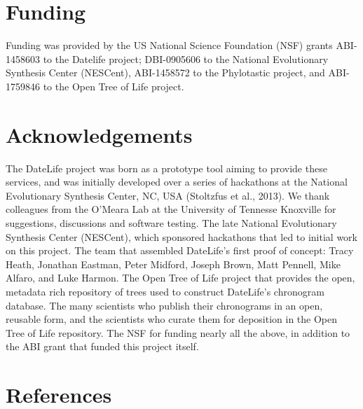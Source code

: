\documentclass[
  man]{apa6}
\begin{document}
\hypertarget{funding}{%
\section{Funding}\label{funding}}

Funding was provided by the US National Science Foundation (NSF) grants ABI-1458603 to the Datelife project; DBI-0905606 to the National Evolutionary Synthesis Center (NESCent), ABI-1458572 to the Phylotastic project, and ABI-1759846 to the Open Tree of Life project.

\hypertarget{acknowledgements}{%
\section{Acknowledgements}\label{acknowledgements}}

The DateLife project was born as a prototype tool aiming to provide these services, and was initially developed over a series of hackathons at the National Evolutionary Synthesis Center, NC, USA (Stoltzfus et al., 2013).
We thank colleagues from the O'Meara Lab at the University
of Tennesse Knoxville for suggestions, discussions and software testing.
The late National Evolutionary Synthesis Center (NESCent), which sponsored hackathons
that led to initial work on this project. The team that assembled DateLife's first proof of concept: Tracy Heath, Jonathan Eastman, Peter Midford, Joseph Brown, Matt Pennell, Mike Alfaro, and Luke Harmon.
The Open Tree of Life project that provides the open, metadata rich repository of
trees used to construct DateLife's chronogram database.
The many scientists who publish their chronograms in an open, reusable form, and the scientists who curate them for deposition in the Open Tree of Life repository.
The NSF for funding nearly all the above, in addition to the ABI grant that funded this project itself.

\newpage

\hypertarget{references}{%
\section{References}\label{references}}

\begingroup
\setlength{\parindent}{-0.5in}
\setlength{\leftskip}{0.5in}
\end{document}

